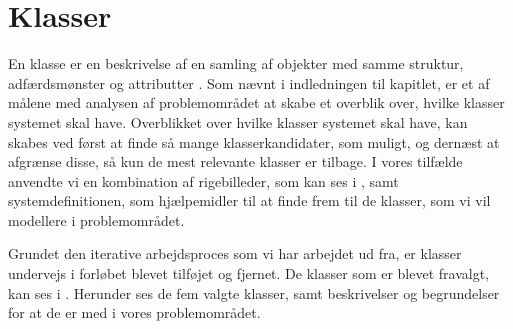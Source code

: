 \section{Klasser}
\label{sec:klasser}

En klasse er en beskrivelse af en samling af objekter med samme struktur, adfærdsmønster og attributter \cite[s. ~51]{ooad}. Som nævnt i indledningen til kapitlet, er et af målene med analysen af problemområdet at skabe et overblik over, hvilke klasser systemet skal have. Overblikket over hvilke klasser systemet skal have, kan skabes ved først at finde så mange klasserkandidater, som muligt, og dernæst at afgrænse disse, så kun de mest relevante klasser er tilbage. I vores tilfælde anvendte vi en kombination af rigebilleder, som kan ses i , samt systemdefinitionen, som hjælpemidler til at finde frem til de klasser, som vi vil modellere i problemområdet.

Grundet den iterative arbejdsproces som vi har arbejdet ud fra, er klasser undervejs i forløbet blevet tilføjet og fjernet. De klasser som er blevet fravalgt, kan ses i . Herunder ses de fem valgte klasser, samt beskrivelser og begrundelser for at de er med i vores problemområdet. 


